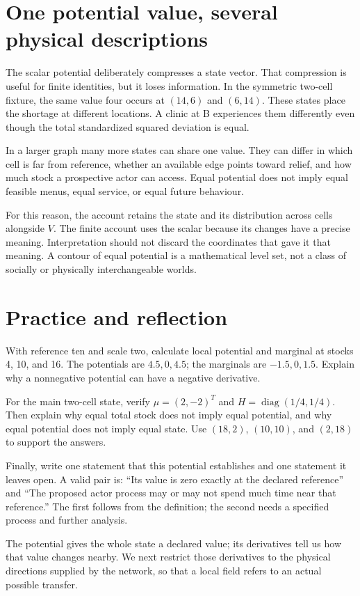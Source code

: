 \section{One potential value, several physical descriptions}
The scalar potential deliberately compresses a state vector. That compression is useful for finite identities, but it loses information. In the symmetric two-cell fixture, the same value four occurs at \((14,6)\) and \((6,14)\). These states place the shortage at different locations. A clinic at B experiences them differently even though the total standardized squared deviation is equal.

In a larger graph many more states can share one value. They can differ in which cell is far from reference, whether an available edge points toward relief, and how much stock a prospective actor can access. Equal potential does not imply equal feasible menus, equal service, or equal future behaviour.

For this reason, the account retains the state and its distribution across cells alongside \(V\). The finite account uses the scalar because its changes have a precise meaning. Interpretation should not discard the coordinates that gave it that meaning. A contour of equal potential is a mathematical level set, not a class of socially or physically interchangeable worlds.

\section{Practice and reflection}
With reference ten and scale two, calculate local potential and marginal at stocks 4, 10, and 16. The potentials are \(4.5,0,4.5\); the marginals are \(-1.5,0,1.5\). Explain why a nonnegative potential can have a negative derivative.

For the main two-cell state, verify \(\mu=(2,-2)^T\) and \(H=\operatorname{diag}(1/4,1/4)\). Then explain why equal total stock does not imply equal potential, and why equal potential does not imply equal state. Use \((18,2)\), \((10,10)\), and \((2,18)\) to support the answers.

Finally, write one statement that this potential establishes and one statement it leaves open. A valid pair is: ``Its value is zero exactly at the declared reference'' and ``The proposed actor process may or may not spend much time near that reference.'' The first follows from the definition; the second needs a specified process and further analysis.

The potential gives the whole state a declared value; its derivatives tell us how that value changes nearby. We next restrict those derivatives to the physical directions supplied by the network, so that a local field refers to an actual possible transfer.
